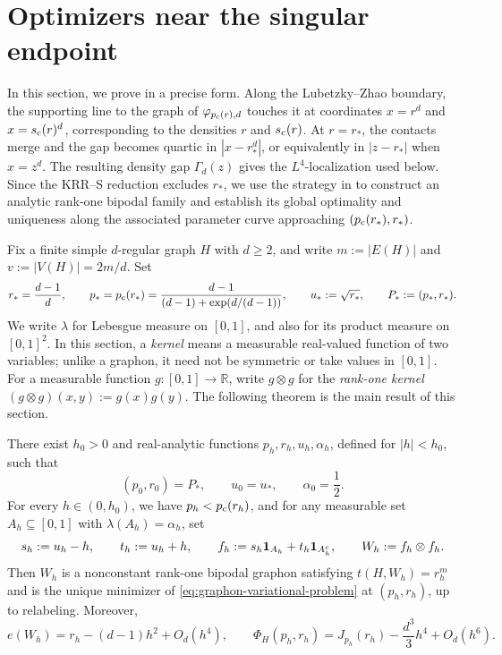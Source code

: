 \section{Optimizers near the singular endpoint}
\label{sec:singular-endpoint}

In this section, we prove  in a precise form.
Along the Lubetzky--Zhao boundary, the supporting line to the graph of
$\varphi_{\pc(r),d}$ touches it at coordinates $x=r^d$ and $x=\sc(r)^d$,
corresponding to the densities $r$ and $\sc(r)$.
At $r=r_*$, the contacts merge and the gap becomes quartic in
$|x-r_*^d|$, or equivalently in $|z-r_*|$ when $x=z^d$.
The resulting density gap $\Gamma_d(z)$ gives the $L^4$-localization used
below.  Since the KRR--S reduction excludes $r_*$, we use the strategy in
 to construct an analytic rank-one bipodal family
and establish its global optimality and uniqueness along the associated
parameter curve approaching $(\pc(r_*),r_*)$.

Fix a finite simple $d$-regular graph $H$ with $d\ge2$,
and write $m:=|E(H)|$ and $v:=|V(H)|=2m/d$.  Set
\begin{equation*}
  r_*=\frac{d-1}{d},
  \qquad
  p_*=\pc(r_*)
  =\frac{d-1}{(d-1)+\exp(d/(d-1))},
  \qquad
  u_*:=\sqrt{r_*},
  \qquad
  P_*:=(p_*,r_*).
\end{equation*}
We write $\lambda$ for Lebesgue measure on $[0,1]$, and also for its
product measure on $[0,1]^2$.
In this section, a \emph{kernel} means a measurable real-valued function of two
variables; unlike a graphon, it need not be symmetric or take values in
$[0,1]$.
For a measurable function $g:[0,1]\to\mathbb R$, write $g\otimes g$ for
the \emph{rank-one kernel} $(g\otimes g)(x,y):=g(x)g(y)$.
The following theorem is the main result of this section.

\begin{theorem}
\label{thm:singular-endpoint}
There exist $h_0>0$ and real-analytic functions
$p_h,r_h,u_h,\alpha_h$, defined for $|h|<h_0$, such that
\[
  (p_0,r_0)=P_*,
  \qquad
  u_0=u_*,
  \qquad
  \alpha_0=\frac12.
\]
For every $h\in(0,h_0)$, we have $p_h<\pc(r_h)$,
and for any measurable set $A_h\subseteq[0,1]$
with $\lambda(A_h)=\alpha_h$, set
\[
  s_h:=u_h-h,
  \qquad
  t_h:=u_h+h,
  \qquad
  f_h:=s_h\1_{A_h}+t_h\1_{A_h^c},
  \qquad
  W_h:=f_h\otimes f_h.
\]
Then $W_h$ is a nonconstant rank-one bipodal graphon satisfying $t(H,W_h)=r_h^m$
and is the unique minimizer of \eqref{eq:graphon-variational-problem}
at $(p_h,r_h)$, up to relabeling.  Moreover,
\begin{equation*}
  e(W_h)=r_h-(d-1)h^2+O_d(h^4),
  \qquad
  \Phi_H(p_h,r_h)
  =J_{p_h}(r_h)-\frac{d^3}{3}h^4+O_d(h^6).
\end{equation*}
\end{theorem}







